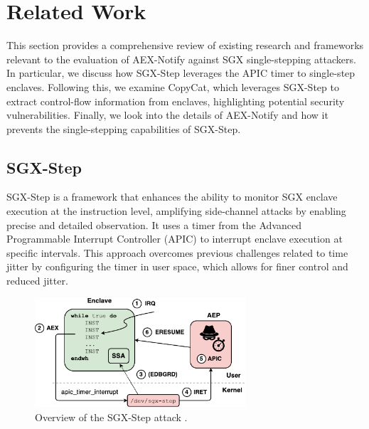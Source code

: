 \documentclass{llncs}
\begin{document}
\section{Related Work}

This section provides a comprehensive review of existing research and
frameworks relevant to the evaluation of AEX-Notify against SGX single-stepping
attackers.
In particular, we discuss how SGX-Step leverages the APIC timer to single-step
enclaves.
Following this, we examine CopyCat, which leverages SGX-Step to extract
control-flow information from enclaves, highlighting potential security
vulnerabilities.
Finally, we look into the details of AEX-Notify and how it prevents the
single-stepping capabilities of SGX-Step.

\subsection{SGX-Step}

SGX-Step \cite{BulckPS17} is a framework that enhances the ability to monitor
SGX enclave execution at the instruction level, amplifying side-channel attacks
by enabling precise and detailed observation.
It uses a timer from the Advanced Programmable Interrupt Controller (APIC) to
interrupt enclave execution at specific intervals.
This approach overcomes previous challenges related to time jitter by
configuring the timer in user space, which allows for finer control and reduced
jitter.

\begin{figure}[t!]
  \centering
  \includegraphics[width=0.7\textwidth]{images/sgx-step-overview.pdf}
  \caption{Overview of the SGX-Step attack \cite{BulckPS17}.}
  \label{fig:sgx-step}
\end{figure}
\end{document}

